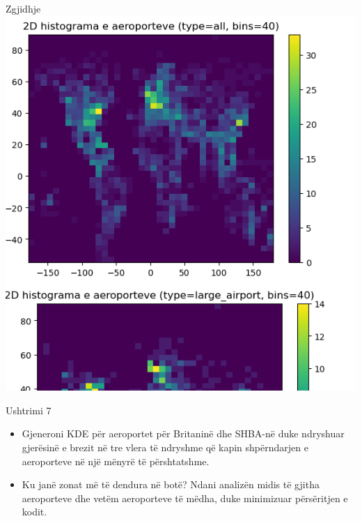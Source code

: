 \documentclass[
  ignorenonframetext,
]{beamer}
\begin{document}
\begin{frame}{Zgjidhje}
\protect\hypertarget{zgjidhje-23}{}
\includegraphics{./Figs/usht6.png}
\end{frame}

\begin{frame}{Ushtrimi 7}
\protect\hypertarget{ushtrimi-7}{}
\begin{itemize}
\item
  Gjeneroni KDE për aeroportet për Britaninë dhe SHBA-në duke ndryshuar
  gjerësinë e brezit në tre vlera të ndryshme që kapin shpërndarjen e
  aeroporteve në një mënyrë të përshtatshme.
\item
  Ku janë zonat më të dendura në botë? Ndani analizën midis të gjitha
  aeroporteve dhe vetëm aeroporteve të mëdha, duke minimizuar
  përsëritjen e kodit.
\end{itemize}
\end{frame}
\end{document}
